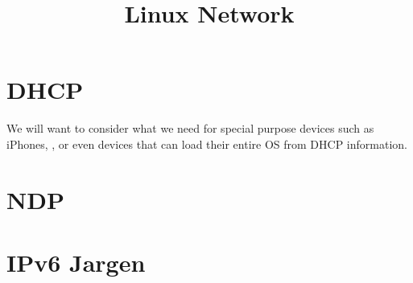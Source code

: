 \documentclass[dvipsnames]{article}
\title{Linux Network}
\begin{document}
\maketitle

% 
% 
% 

\section{DHCP}
\label{sec:dhcp}

We will want to consider what we need for special purpose devices such as
iPhones, , or even  devices that can load their entire OS from DHCP
information.

\section{NDP}


\section{IPv6 Jargen}
\end{document}
